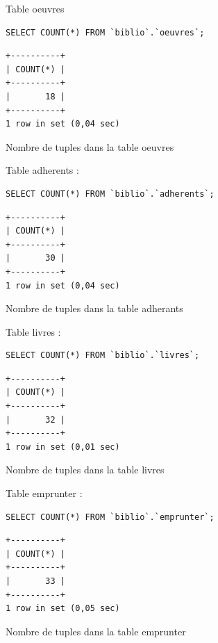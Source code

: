 \documentclass{article}
\begin{document}
\begin{center}
\begin{minipage}{0.45\linewidth}
Table oeuvres
\begin{listing}[H]
\begin{verbatim}
SELECT COUNT(*) FROM `biblio`.`oeuvres`;
\end{verbatim}

\begin{verbatim}
+----------+
| COUNT(*) |
+----------+
|       18 |
+----------+
1 row in set (0,04 sec)
\end{verbatim}
	\caption{Nombre de tuples dans la table oeuvres}
\end{listing}
\end{minipage} \begin{minipage}{0.45\linewidth}
Table adherents :
\begin{listing}[H]
\begin{verbatim}
SELECT COUNT(*) FROM `biblio`.`adherents`;
\end{verbatim}
\begin{verbatim}
+----------+
| COUNT(*) |
+----------+
|       30 |
+----------+
1 row in set (0,04 sec)
\end{verbatim}
\caption{Nombre de tuples dans la table adherants}
\end{listing}
\end{minipage}

\begin{minipage}{0.45\linewidth}
Table livres :
\begin{listing}[H]
\begin{verbatim}
SELECT COUNT(*) FROM `biblio`.`livres`;
\end{verbatim}
\begin{verbatim}
+----------+
| COUNT(*) |
+----------+
|       32 |
+----------+
1 row in set (0,01 sec)
\end{verbatim}
\caption{Nombre de tuples dans la table livres}
\end{listing}
\end{minipage} \begin{minipage}{0.45\linewidth}
Table emprunter :
\begin{listing}[H]
\begin{verbatim}
SELECT COUNT(*) FROM `biblio`.`emprunter`;
\end{verbatim}
\begin{verbatim}
+----------+
| COUNT(*) |
+----------+
|       33 |
+----------+
1 row in set (0,05 sec)	
\end{verbatim}
\caption{Nombre de tuples dans la table emprunter}
\end{listing}	
\end{minipage}


\end{center}
\end{document}
